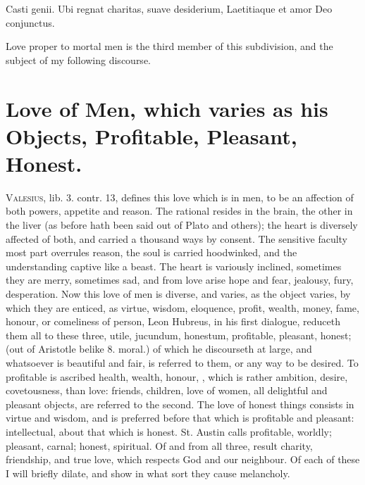 {Casti genii.
Ubi regnat charitas, suave desiderium,
Laetitiaque et amor Deo conjunctus.

Love proper to mortal men is the third member of this subdivision, and
the subject of my following discourse.


\section[Love of Men]{Love of Men, which varies as his Objects, Profitable, Pleasant, Honest.}

\lettrine{V}{alesius}, lib. 3. contr. 13, defines this love which is in men, to be
an affection of both powers, appetite and reason. The rational
resides in the brain, the other in the liver (as before hath been said
out of Plato and others); the heart is diversely affected of both, and
carried a thousand ways by consent. The sensitive faculty most part
overrules reason, the soul is carried hoodwinked, and the understanding
captive like a beast. The heart is variously inclined, sometimes
they are merry, sometimes sad, and from love arise hope and fear,
jealousy, fury, desperation. Now this love of men is diverse, and
varies, as the object varies, by which they are enticed, as virtue,
wisdom, eloquence, profit, wealth, money, fame, honour, or comeliness
of person, \etc{} Leon Hubreus, in his first dialogue, reduceth them all
to these three, utile, jucundum, honestum, profitable, pleasant,
honest; (out of Aristotle belike 8. moral.) of which he discourseth at
large, and whatsoever is beautiful and fair, is referred to them, or
any way to be desired. To profitable is ascribed health, wealth,
honour, \etc{}, which is rather ambition, desire, covetousness, than love:
friends, children, love of women, all delightful and pleasant
objects, are referred to the second. The love of honest things consists
in virtue and wisdom, and is preferred before that which is profitable
and pleasant: intellectual, about that which is honest. St.
Austin calls profitable, worldly; pleasant, carnal; honest, spiritual.
Of and from all three, result charity, friendship, and true love,
which respects God and our neighbour. Of each of these I will briefly
dilate, and show in what sort they cause melancholy.

}
